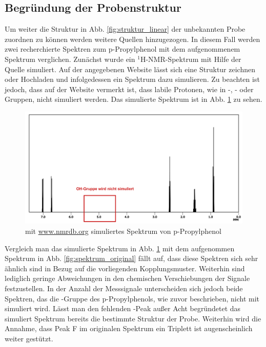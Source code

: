 \subsection{Begründung der Probenstruktur}
Um weiter die Struktur in Abb. \ref{fig:struktur_linear} der unbekannten Probe zuordnen zu können werden weitere Quellen hinzugezogen. In diesem Fall werden zwei recherchierte Spektren zum p-Propylphenol mit dem aufgenommenem Spektrum verglichen.
Zunächst wurde ein ${}^1$H-NMR-Spektrum mit Hilfe der Quelle \cite{Patiny.30.06.2021} simuliert. Auf der angegebenen Website lässt sich eine Struktur zeichnen oder Hochladen und infolgedessen ein Spektrum dazu simulieren. Zu beachten ist jedoch, dass auf der Website vermerkt ist, dass labile Protonen, wie in -, - oder Gruppen, nicht simuliert werden.
Das simulierte Spektrum ist in Abb. \ref{fig:spektrum_simuliert} zu sehen.
\begin{figure}[h!]
	\centering
	\includegraphics[width=\textwidth]{img/spektrum_simuliert_gesamt_oh.png}
	\caption{mit \url{www.nmrdb.org} simuliertes Spektrum von p-Propylphenol \cite{Patiny.30.06.2021}}
	\label{fig:spektrum_simuliert}
\end{figure}
\FloatBarrier
Vergleich man das simulierte Spektrum in Abb. \ref{fig:spektrum_simuliert} mit dem aufgenommen Spektrum in Abb. \ref{fig:spektrum_original} fällt auf, dass diese Spektren sich sehr ähnlich sind in Bezug auf die vorliegenden Kopplungsmuster. Weiterhin sind lediglich geringe Abweichungen in den chemischen Verschiebungen der Signale festzustellen. In der Anzahl der Messsignale unterscheiden sich jedoch beide Spektren, das die -Gruppe des p-Propylphenols, wie zuvor beschrieben, nicht mit simuliert wird.
Lässt man den fehlenden -Peak außer Acht begründetet das simuliert Spektrum bereits die bestimmte Struktur der Probe. Weiterhin wird die Annahme, dass Peak F im originalen Spektrum ein Triplett ist augenscheinlich weiter gestützt.\\
